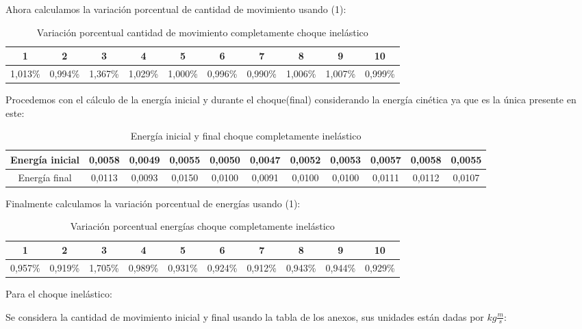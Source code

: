 \documentclass[a4paper]{article}
\begin{document}
Ahora calculamos la variación porcentual de cantidad de movimiento usando (1):
\begin{table}[H]
    \centering
    \begin{tabular}{|c|c|c|c|c|c|c|c|c|c|}
    \hline
        1 & 2 & 3 & 4 & 5 & 6 & 7 & 8 & 9 & 10 \\ \hline
        1,013\%  & 0,994\%  & 1,367\%  & 1,029\%  & 1,000\%  & 0,996\%  & 0,990\%  & 1,006\%  & 1,007\%  & 0,999\%  \\ \hline
    \end{tabular}
    \caption{Variación porcentual cantidad de movimiento completamente choque inelástico}
\end{table}

Procedemos con el cálculo de la energía inicial y durante el choque(final) considerando la energía cinética ya que es la única presente en este: 

\begin{table}[!ht]
    \centering
    \begin{tabular}{|c|c|c|c|c|c|c|c|c|c|c|}
    \hline
        Energía inicial & 0,0058 & 0,0049 & 0,0055 & 0,0050 & 0,0047 & 0,0052 & 0,0053 & 0,0057 & 0,0058 & 0,0055 \\ \hline
        Energía final  & 0,0113  & 0,0093  & 0,0150  & 0,0100  & 0,0091  & 0,0100  & 0,0100  & 0,0111  & 0,0112  & 0,0107  \\ \hline
    \end{tabular}
    \caption{Energía inicial y final choque completamente inelástico}
\end{table}

Finalmente calculamos la variación porcentual de energías usando (1): 
\begin{table}[H]
    \centering
    \begin{tabular}{|c|c|c|c|c|c|c|c|c|c|}
    \hline
        1 & 2 & 3 & 4 & 5 & 6 & 7 & 8 & 9 & 10 \\ \hline
        0,957\%  & 0,919\%  & 1,705\%  & 0,989\%  & 0,931\%  & 0,924\%  & 0,912\%  & 0,943\%  & 0,944\%  & 0,929\%  \\ \hline
    \end{tabular}
    \caption{Variación porcentual energías choque completamente inelástico}
\end{table}

Para el choque inelástico:

Se considera la cantidad de movimiento inicial y final usando la tabla de los anexos, sus unidades están dadas por $kg \frac{m}{s}$:
\end{document}
